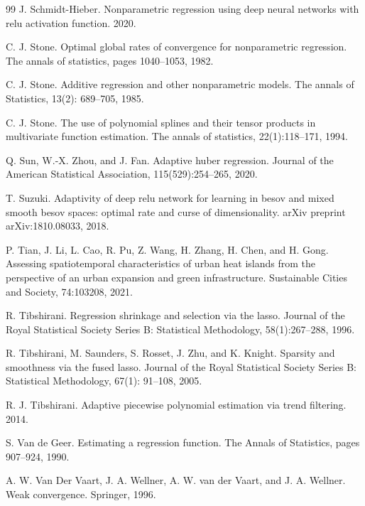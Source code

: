 \documentclass[twoside,11pt]{article}
\begin{document}
\begin{thebibliography}{99}
 J. Schmidt-Hieber. Nonparametric regression using deep neural networks with relu activation function. 2020.

 C. J. Stone. Optimal global rates of convergence for nonparametric regression. The annals of statistics, pages 1040--1053, 1982.

 C. J. Stone. Additive regression and other nonparametric models. The annals of Statistics, 13(2): 689--705, 1985.

 C. J. Stone. The use of polynomial splines and their tensor products in multivariate function estimation. The annals of statistics, 22(1):118--171, 1994.

 Q. Sun, W.-X. Zhou, and J. Fan. Adaptive huber regression. Journal of the American Statistical Association, 115(529):254--265, 2020.

 T. Suzuki. Adaptivity of deep relu network for learning in besov and mixed smooth besov spaces: optimal rate and curse of dimensionality. arXiv preprint arXiv:1810.08033, 2018.

 P. Tian, J. Li, L. Cao, R. Pu, Z. Wang, H. Zhang, H. Chen, and H. Gong. Assessing spatiotemporal characteristics of urban heat islands from the perspective of an urban expansion and green infrastructure. Sustainable Cities and Society, 74:103208, 2021.

 R. Tibshirani. Regression shrinkage and selection via the lasso. Journal of the Royal Statistical Society Series B: Statistical Methodology, 58(1):267--288, 1996.

 R. Tibshirani, M. Saunders, S. Rosset, J. Zhu, and K. Knight. Sparsity and smoothness via the fused lasso. Journal of the Royal Statistical Society Series B: Statistical Methodology, 67(1): 91--108, 2005.

 R. J. Tibshirani. Adaptive piecewise polynomial estimation via trend filtering. 2014.

 S. Van de Geer. Estimating a regression function. The Annals of Statistics, pages 907--924, 1990.

 A. W. Van Der Vaart, J. A. Wellner, A. W. van der Vaart, and J. A. Wellner. Weak convergence. Springer, 1996.


\end{thebibliography}
\end{document}

